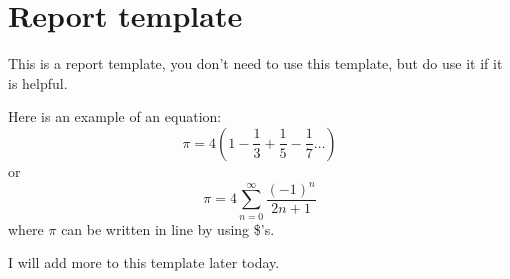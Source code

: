 \documentclass[12pt]{article}
\begin{document}
\section*{Report template}

This is a report template, you don't need to use this template, but do
use it if it is helpful.

Here is an example of an equation:
\begin{equation}
  \pi=4\left(1-\frac{1}{3}+\frac{1}{5}-\frac{1}{7}\ldots\right)
\end{equation}
or
\begin{equation}
  \pi=4\sum_{n=0}^\infty\frac{(-1)^{n}}{2n+1}
\end{equation}
where $\pi$ can be written in line by using \$'s. 

I will add more to this template later today.
\end{document}

